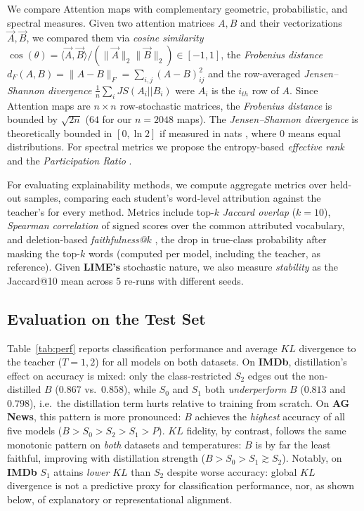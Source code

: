 \documentclass[conference]{IEEEtran}
\begin{document}
We compare Attention maps with complementary geometric, probabilistic, and spectral measures. Given two attention matrices $A,B$ and their vectorizations $\vec A, \vec B$, we compared them via \textit{cosine similarity} $\cos(\theta)=\langle \vec A,\vec B\rangle/(\|\vec A\|_2\|\vec B\|_2)\in[-1,1]$, the \textit{Frobenius distance} $d_F(A,B)=\|A-B\|_F=\sum_{i,j}(A-B)^2_{ij}$ and the row-averaged \textit{Jensen--Shannon divergence} $\frac{1}{n}\sum_i JS(A_i||B_i)$ were $A_i$ is the $i_{th}$ row of $A$. Since Attention maps are $n \times n$ row-stochastic matrices, the \textit{Frobenius distance} is bounded by $\sqrt{2n}$ ($64$ for our $n=2048$ maps). The \textit{Jensen--Shannon divergence} is theoretically bounded in $[0,\ln 2]$ if measured in nats \cite{lin1991divergence}, where $0$ means equal distributions. For spectral metrics we propose the entropy-based \textit{effective rank} \cite{roy2007effective} and the \textit{Participation Ratio} \cite{recanatesi2022scale}.

For evaluating explainability methods, we compute aggregate metrics over held-out samples, comparing each student's word-level attribution against the teacher's for every method. Metrics include top-$k$ \textit{Jaccard overlap} ($k=10$), \textit{Spearman correlation} of signed scores over the common attributed vocabulary, and deletion-based \textit{faithfulness@$k$} \cite{deyoung2020eraser}, the drop in true-class probability after masking the top-$k$ words (computed per model, including the teacher, as reference). Given \textbf{LIME's} stochastic nature, we also measure \textit{stability} as the Jaccard@10 mean across $5$ re-runs with different seeds.

\subsection{Evaluation on the Test Set}\label{sec:test-eval}

Table~\ref{tab:perf} reports classification performance and average $KL$ divergence to the teacher ($T=1,2$) for all models on both datasets. On \textbf{IMDb}, distillation's effect on accuracy is mixed: only the class-restricted $S_2$ edges out the non-distilled $B$ ($0.867$ vs.\ $0.858$), while $S_0$ and $S_1$ both \emph{underperform} $B$ ($0.813$ and $0.798$), i.e.\ the distillation term hurts relative to training from scratch. On \textbf{AG News}, this pattern is more pronounced: $B$ achieves the \emph{highest} accuracy of all five models ($B>S_0>S_2>S_1>P$). $KL$ fidelity, by contrast, follows the same monotonic pattern on \emph{both} datasets and temperatures: $B$ is by far the least faithful, improving with distillation strength ($B>S_0>S_1\gtrsim S_2$). Notably, on \textbf{IMDb} $S_1$ attains \emph{lower} $KL$ than $S_2$ despite worse accuracy: global $KL$ divergence is not a predictive proxy for classification performance, nor, as shown below, of explanatory or representational alignment.
\end{document}
